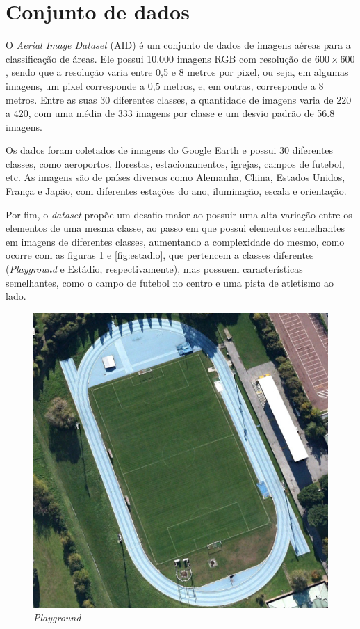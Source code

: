 \documentclass[conference]{IEEEtran}
\begin{document}
\section{Conjunto de dados}

    O \textit{Aerial Image Dataset} (AID) é um conjunto de dados de imagens aéreas para a classificação de áreas. Ele possui 10.000 imagens RGB com resolução de \(600 \times 600\), sendo que a resolução varia entre 0,5 e 8 metros por pixel, ou seja, em algumas imagens, um pixel corresponde a 0,5 metros, e, em outras, corresponde a 8 metros. Entre as suas 30 diferentes classes, a quantidade de imagens varia de 220 a 420, com uma média de 333 imagens por classe e um desvio padrão de 56.8 imagens. 
    
    Os dados foram coletados de imagens do Google Earth e possui 30 diferentes classes, como aeroportos, florestas, estacionamentos, igrejas, campos de futebol, etc. As imagens são de países diversos como Alemanha, China, Estados Unidos, França e Japão, com diferentes estações do ano, iluminação, escala e orientação.

    Por fim, o \textit{dataset} propõe um desafio maior ao possuir uma alta variação entre os elementos de uma mesma classe, ao passo em que possui elementos semelhantes em imagens de diferentes classes, aumentando a complexidade do mesmo, como ocorre com as figuras \ref{fig:playground} e \ref{fig:estadio}, que pertencem a classes diferentes (\textit{Playground} e Estádio, respectivamente), mas possuem características semelhantes, como o campo de futebol no centro e uma pista de atletismo ao lado.

    \begin{figure}[!htb]
        \centering
        \includegraphics[width=0.5\linewidth]{Images/playground_184.jpg}
        \caption{\textit{Playground}}
        \label{fig:playground}
    \end{figure}
\end{document}
